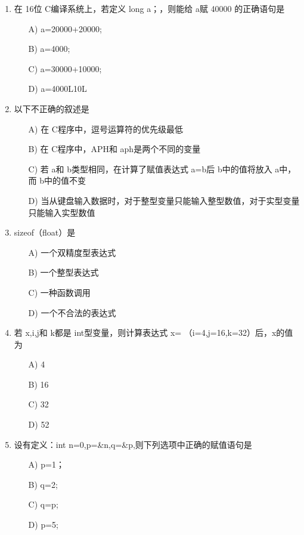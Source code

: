 \documentclass[12pt,a4paper]{article}
\begin{document}
\begin{enumerate}
    \item 在 16位 C编译系统上，若定义 long a；，则能给 a赋 40000 的正确语句是
    \begin{enumerate}
        \item[A)] a=20000+20000;
        \item[B)] a=4000;
        \item[C)] a=30000+10000;
        \item[D)] a=4000L\*10L
    \end{enumerate}
    
    \item 以下不正确的叙述是
    \begin{enumerate}
        \item[A)] 在 C程序中，逗号运算符的优先级最低
        \item[B)] 在 C程序中，APH和 aph是两个不同的变量
        \item[C)] 若 a和 b类型相同，在计算了赋值表达式 a=b后 b中的值将放入 a中，而 b中的值不变
        \item[D)] 当从键盘输入数据时，对于整型变量只能输入整型数值，对于实型变量只能输入实型数值
    \end{enumerate}
    
    \item sizeof（float）是
    \begin{enumerate}
        \item[A)] 一个双精度型表达式
        \item[B)] 一个整型表达式
        \item[C)] 一种函数调用
        \item[D)] 一个不合法的表达式
    \end{enumerate}
    
    \item 若 x,i,j和 k都是 int型变量，则计算表达式 x= （i=4,j=16,k=32）后，x的值为
    \begin{enumerate}
        \item[A)] 4
        \item[B)] 16
        \item[C)] 32
        \item[D)] 52
    \end{enumerate}
    
    \item 设有定义：int n=0,\*p=\&n,\*\*q=\&p,则下列选项中正确的赋值语句是
    \begin{enumerate}
        \item[A)] p=1；
        \item[B)] \*q=2;
        \item[C)] q=p;
        \item[D)] \*p=5;
    \end{enumerate}
    

\end{enumerate}
\end{document}
